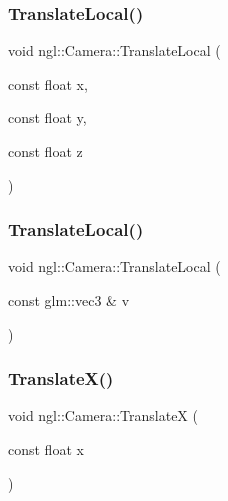 \subsubsection{\texorpdfstring{Translate\+Local()}{TranslateLocal()}\hspace{0.1cm}{\footnotesize\ttfamily [1/2]}}
{\footnotesize\ttfamily void ngl\+::\+Camera\+::\+Translate\+Local (\begin{DoxyParamCaption}\item[{const float}]{x,  }\item[{const float}]{y,  }\item[{const float}]{z }\end{DoxyParamCaption})}

\mbox{\label{classngl_1_1_camera_a5d24f674c2e0026da4fb5c96f43ee792}} 
\subsubsection{\texorpdfstring{Translate\+Local()}{TranslateLocal()}\hspace{0.1cm}{\footnotesize\ttfamily [2/2]}}
{\footnotesize\ttfamily void ngl\+::\+Camera\+::\+Translate\+Local (\begin{DoxyParamCaption}\item[{const glm\+::vec3 \&}]{v }\end{DoxyParamCaption})}

\mbox{\label{classngl_1_1_camera_a7fbd37a79260912d80fad6cb262586c0}} 
\subsubsection{\texorpdfstring{Translate\+X()}{TranslateX()}}
{\footnotesize\ttfamily void ngl\+::\+Camera\+::\+TranslateX (\begin{DoxyParamCaption}\item[{const float}]{x }\end{DoxyParamCaption})}

\mbox{\label{classngl_1_1_camera_ae04d720aa999b98b627914250d2449e4}} 
